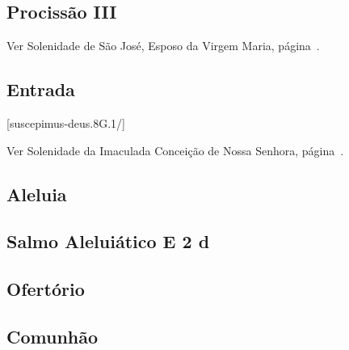\subsection{Procissão III}
\begin{rubrica}
  Ver Solenidade de São José, Esposo da Virgem Maria, página~\pageref{subsection:proprium-sanctorum/sancti-ioseph-sponsi-bmv/psalmus-responsorius}.
\end{rubrica}

\AllowPageFlush

\subsection{Entrada}\label{subsection:proprium-sanctorum/in-praesentatione-domini/introitus}
[suscepimus-deus.8G.1/]


\begin{rubrica}
  Ver Solenidade da Imaculada Conceição de Nossa Senhora, página~\pageref{subsection:proprium-sanctorum/in-conceptione-immaculata-bmv/psalmus-responsorius}.
\end{rubrica}

\subsection{Aleluia}\label{subsection:proprium-sanctorum/in-praesentatione-domini/alleluia}

\AllowPageFlush

\subsection[Salmo Aleluiático]{Salmo Aleluiático \textmd{E 2 d}}\label{subsection:proprium-sanctorum/in-praesentatione-domini/psalmus-alleluiaticus}

\AllowPageFlush

\subsection{Ofertório}\label{subsection:proprium-sanctorum/in-praesentatione-domini/offertorium}

\AllowPageFlush

\subsection{Comunhão}\label{subsection:proprium-sanctorum/in-praesentatione-domini/communio}
